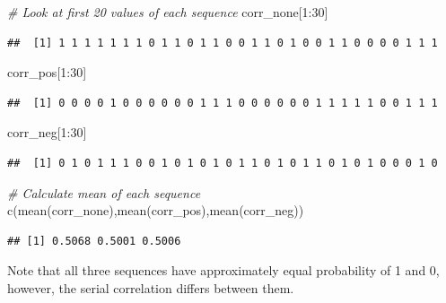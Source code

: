 \documentclass[
  11pt,
]{book}
\newenvironment{Shaded}{\begin{snugshade}}{\end{snugshade}}
\newcommand{\CommentTok}[1]{\textcolor[rgb]{0.56,0.35,0.01}{\textit{#1}}}
\newcommand{\DecValTok}[1]{\textcolor[rgb]{0.00,0.00,0.81}{#1}}
\newcommand{\FunctionTok}[1]{\textcolor[rgb]{0.00,0.00,0.00}{#1}}
\newcommand{\NormalTok}[1]{#1}
\newcommand{\SpecialCharTok}[1]{\textcolor[rgb]{0.00,0.00,0.00}{#1}}
\theoremstyle{definition}
\theoremstyle{definition}
\theoremstyle{definition}
\theoremstyle{definition}
\theoremstyle{remark}
\begin{document}
\newpage

\begin{Shaded}
\begin{Highlighting}[]
\CommentTok{\# Look at first 20 values of each sequence}
\NormalTok{corr\_none[}\DecValTok{1}\SpecialCharTok{:}\DecValTok{30}\NormalTok{]}
\end{Highlighting}
\end{Shaded}

\begin{verbatim}
##  [1] 1 1 1 1 1 1 1 0 1 1 0 1 1 0 0 1 1 0 1 0 0 1 1 0 0 0 0 1 1 1
\end{verbatim}

\begin{Shaded}
\begin{Highlighting}[]
\NormalTok{corr\_pos[}\DecValTok{1}\SpecialCharTok{:}\DecValTok{30}\NormalTok{]}
\end{Highlighting}
\end{Shaded}

\begin{verbatim}
##  [1] 0 0 0 0 1 0 0 0 0 0 0 1 1 1 0 0 0 0 0 0 1 1 1 1 1 0 0 1 1 1
\end{verbatim}

\begin{Shaded}
\begin{Highlighting}[]
\NormalTok{corr\_neg[}\DecValTok{1}\SpecialCharTok{:}\DecValTok{30}\NormalTok{]}
\end{Highlighting}
\end{Shaded}

\begin{verbatim}
##  [1] 0 1 0 1 1 1 0 0 1 0 1 0 1 0 1 1 0 1 0 1 1 0 1 0 1 0 0 0 1 0
\end{verbatim}

\begin{Shaded}
\begin{Highlighting}[]
\CommentTok{\# Calculate mean of each sequence}
\FunctionTok{c}\NormalTok{(}\FunctionTok{mean}\NormalTok{(corr\_none),}\FunctionTok{mean}\NormalTok{(corr\_pos),}\FunctionTok{mean}\NormalTok{(corr\_neg))}
\end{Highlighting}
\end{Shaded}

\begin{verbatim}
## [1] 0.5068 0.5001 0.5006
\end{verbatim}

Note that all three sequences have approximately equal probability of 1 and 0, however, the serial correlation differs between them.
\end{document}

